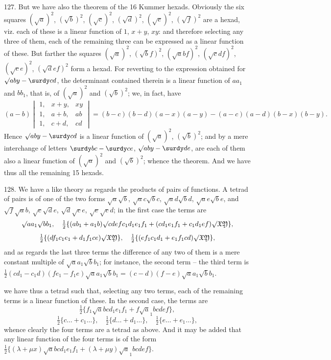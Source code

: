 \documentclass[12pt]{article}
\theoremstyle{plain}
\begin{document}
127. But we have also the theorem of the 16 Kummer hexads. Obviously the six squares $(\surd a)^2$, $(\surd b)^2$, $(\surd c)^2$, $(\surd d)^2$, $(\surd e)^2$, $(\surd f)^2$ are a hexad, viz. each of these is a linear function of $1$, $x + y$, $xy$: and therefore selecting any three of them, each of the remaining three can be expressed as a linear function of these. But farther the squares $(\surd a)^2$, $(\surd bf)^2$, $(\surd abf)^2$, $(\surd cdf)^2$, $(\surd ce)^2$, $(\surd def)^2$ form a hexad. For reverting to the expression obtained for $\surd aby - \surdy cd$, the determinant contained therein is a linear function of $aa_1$ and $bb_1$, that is, of $(\surd a)^2$ and $(\surd b)^2$; we, in fact, have
\[
(a - b)
\begin{vmatrix}
1, & x + y, & xy \\
1, & a + b, & ab \\
1, & c + d, & cd
\end{vmatrix}
= (b - c)(b - d)(a - x)(a - y) - (a - c)(a - d)(b - x)(b - y).
\]
Hence $\surd aby - \surdy cd$ is a linear function of $(\surd a)^2$, $(\surd b)^2$; and by a mere interchange of letters $\surdy bc - \surdy ce$, $\surd aby - \surdy de$, are each of them also a linear function of $(\surd a)^2$ and $(\surd b)^2$; whence the theorem. And we have thus all the remaining 15 hexads.

128. We have a like theory as regards the products of pairs of functions. A tetrad of pairs is of one of the two forms $\surd a\surd b$, $\surd ac\surd bc$, $\surd ad\surd bd$, $\surd ae\surd be$, and $\surd f\surd ab$, $\surd c\surd de$, $\surd d\surd ce$, $\surd e\surd cd$; in the first case the terms are
\[
\surd aa_1\surd bb_1,\quad
\tfrac12 \{(ab_1 + a_1 b)\surd cdefc_1 d_1 e_1 f_1 + (cd_1 e_1 f_1 + c_1 d_1 ef)\surd\mathfrak{XY}\},
\]
\[
\tfrac12 \{(df_1 c_1 e_1 + d_1 f_1 ce)\surd\mathfrak{XY}\},\quad
\tfrac12 \{(ef_1 c_1 d_1 + e_1 f_1 cd)\surd\mathfrak{XY}\},
\]
and as regards the last three terms the difference of any two of them is a mere constant multiple of $\surd aa_1\surd bb_1$; for instance, the second term -- the third term is $\tfrac12 (cd_1 - c_1 d)(fe_1 - f_1 e) \surd aa_1\surd bb_1 = (c - d)(f - e) \surd aa_1\surd bb_1$.

\newpage
\setcounter{page}{553}

\noindent
we have thus a tetrad such that, selecting any two terms, each of the remaining terms is a linear function of these. In the second case, the terms are
\[
\tfrac12 \{f_1 \surd abc d_1 e_1 f_1 + f \surd a_1 bcde f\},
\]
\[
\tfrac12 \{c \dots + c_1 \dots \},\quad
\tfrac12 \{d \dots + d_1 \dots \},\quad
\tfrac12 \{e \dots + e_1 \dots \},
\]
whence clearly the four terms are a tetrad as above. And it may be added that any linear function of the four terms is of the form $\tfrac12 \{(\lambda + \mu x)\surd abc d_1 e_1 f_1 + (\lambda + \mu y)\surd a_1 bcde f\}$.
\end{document}
